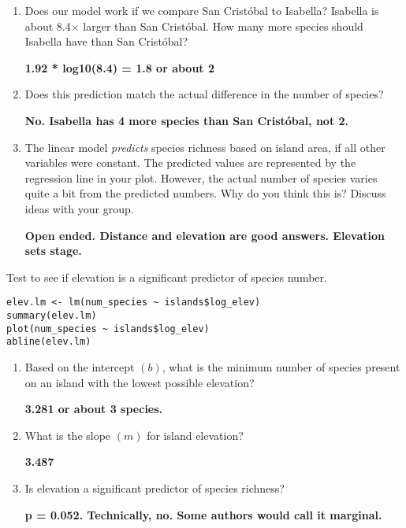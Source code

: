 \documentclass[11pt]{article}
\begin{document}
\begin{enumerate}[resume]
\item Does our model work if we compare San Cristóbal to Isabella? Isabella is about 8.4$\times$ larger than San Cristóbal. How many more species should Isabella have than San Cristóbal?

\textbf{ 1.92 * log10(8.4) = 1.8 or about 2}

\vspace{2\baselineskip}
 
\item Does this prediction match the actual difference in the number of species? 
 
\textbf{No. Isabella has 4 more species than San Cristóbal, not 2.}

\vspace{2\baselineskip}
 
\item The linear model \emph{predicts} species richness based on island area, if all other variables were constant. The predicted values are represented by the regression line in your plot.  However, the actual number of species varies quite a bit from the predicted numbers. Why do you think this is? Discuss ideas with your group.

\textbf{Open ended. Distance and elevation are good answers. Elevation sets stage.}

\vspace{2\baselineskip}

\end{enumerate}
 

Test to see if elevation is a significant predictor of species number.

\begin{verbatim}
elev.lm <- lm(num_species ~ islands$log_elev)
summary(elev.lm)
plot(num_species ~ islands$log_elev)
abline(elev.lm)
\end{verbatim}

\begin{enumerate}[resume]

\item Based on the intercept $(b)$, what is the minimum number of species present on an island with the lowest possible elevation?

\textbf{3.281 or about 3 species.}

\vspace{2\baselineskip}

\item What is the slope $(m)$ for island elevation?

\textbf{3.487}

\vspace{2\baselineskip}

\item Is elevation a significant predictor of species richness? 

\textbf{p = 0.052. Technically, no. Some authors would call it marginal.}

\vspace{1\baselineskip}

\end{enumerate}
\end{document}
